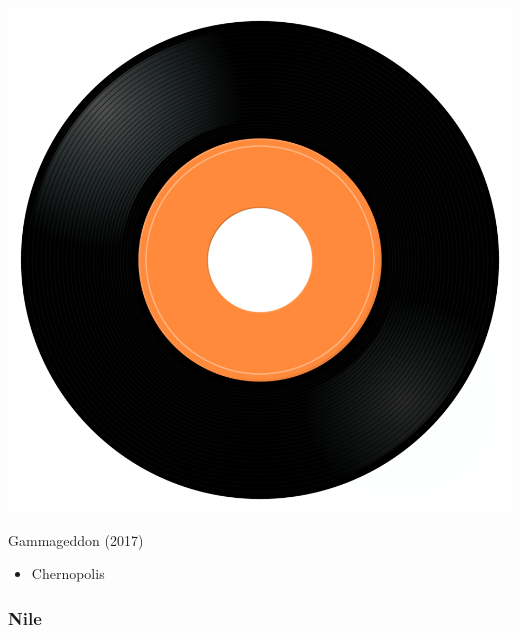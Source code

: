 \begin{minipage}[t]{0.25\textwidth}\vspace{0pt}
\captionsetup{type=figure}
\includegraphics[width=\textwidth]{Images/cover.png}
\caption*{Gammageddon (2017)}
\end{minipage}
\begin{minipage}[t]{0.25\textwidth}\vspace{0pt}
\begin{itemize}[nosep,leftmargin=1em,labelwidth=*,align=left]
	\setlength{\itemsep}{0pt}
	\item Chernopolis
\end{itemize}
\end{minipage}

\subsubsection{Nile}


